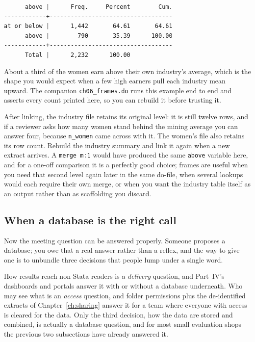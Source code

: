 \par
{\footnotesize
\begin{verbatim}
      above |      Freq.     Percent        Cum.
------------+-----------------------------------
at or below |      1,442       64.61       64.61
      above |        790       35.39      100.00
------------+-----------------------------------
      Total |      2,232      100.00
\end{verbatim}
}
About a third of the women earn above their own industry's average, which is the shape you would expect when a few high earners pull each industry mean upward. The companion \texttt{ch06\_frames.do} runs this example end to end and asserts every count printed here, so you can rebuild it before trusting it.

After linking, the industry file retains its original level: it is still twelve rows, and if a reviewer asks how many women stand behind the mining average you can answer four, because \texttt{n\_women} came across with it. The women's file also retains its row count. Rebuild the industry summary and link it again when a new extract arrives. A \texttt{merge m:1} would have produced the same \texttt{above} variable here, and for a one-off comparison it is a perfectly good choice; frames are useful when you need that second level again later in the same do-file, when several lookups would each require their own merge, or when you want the industry table itself as an output rather than as scaffolding you discard.

\subsection{When a database is the right call}\label{sec:ch06-dbcase}
Now the meeting question can be answered properly. Someone proposes a database; you owe that a real answer rather than a reflex, and the way to give one is to unbundle three decisions that people lump under a single word.

How results reach non-Stata readers is a \emph{delivery} question, and Part~IV's dashboards and portals answer it with or without a database underneath. Who may see what is an \emph{access} question, and folder permissions plus the de-identified extracts of Chapter~\ref{ch:sharing} answer it for a team where everyone with access is cleared for the data. Only the third decision, how the data are stored and combined, is actually a database question, and for most small evaluation shops the previous two subsections have already answered it.

